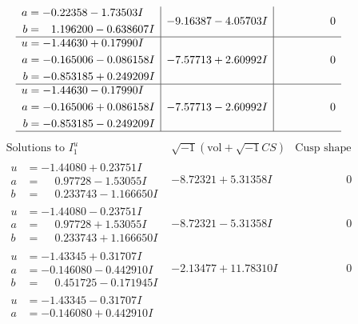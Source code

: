 \documentclass[1p]{elsarticle_modified}
\theoremstyle{definition}
\newcommand{\I}{\sqrt{-1}}
\begin{document}
$$\begin{array}{c|c|c}
\begin{aligned}
a &= -0.22358 - 1.73503 I \\
b &= \phantom{-}1.196200 - 0.638607 I\end{aligned}
 & -9.16387 - 4.05703 I & \phantom{-0.000000 } 0 \\ \hline\begin{aligned}
u &= -1.44630 + 0.17990 I \\
a &= -0.165006 - 0.086158 I \\
b &= -0.853185 + 0.249209 I\end{aligned}
 & -7.57713 + 2.60992 I & \phantom{-0.000000 } 0 \\ \hline\begin{aligned}
u &= -1.44630 - 0.17990 I \\
a &= -0.165006 + 0.086158 I \\
b &= -0.853185 - 0.249209 I\end{aligned}
 & -7.57713 - 2.60992 I & \phantom{-0.000000 } 0\\
 \hline 
 \end{array}$$\newpage$$\begin{array}{c|c|c}  
\text{Solutions to }I^u_{1}& \I (\text{vol} + \sqrt{-1}CS) & \text{Cusp shape}\\
 \hline 
\begin{aligned}
u &= -1.44080 + 0.23751 I \\
a &= \phantom{-}0.97728 - 1.53055 I \\
b &= \phantom{-}0.233743 - 1.166650 I\end{aligned}
 & -8.72321 + 5.31358 I & \phantom{-0.000000 } 0 \\ \hline\begin{aligned}
u &= -1.44080 - 0.23751 I \\
a &= \phantom{-}0.97728 + 1.53055 I \\
b &= \phantom{-}0.233743 + 1.166650 I\end{aligned}
 & -8.72321 - 5.31358 I & \phantom{-0.000000 } 0 \\ \hline\begin{aligned}
u &= -1.43345 + 0.31707 I \\
a &= -0.146080 - 0.442910 I \\
b &= \phantom{-}0.451725 - 0.171945 I\end{aligned}
 & -2.13477 + 11.78310 I & \phantom{-0.000000 } 0 \\ \hline\begin{aligned}
u &= -1.43345 - 0.31707 I \\
a &= -0.146080 + 0.442910 I \\

\end{aligned}
\end{array}$$
\end{document}
